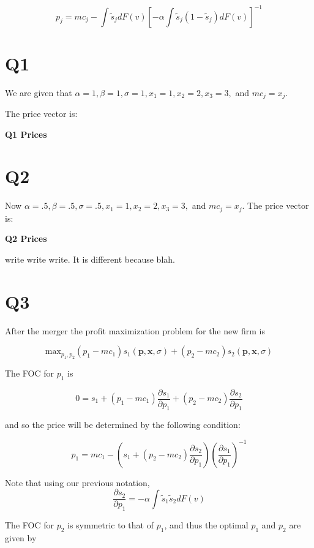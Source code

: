 \documentclass{article}
\newcommand{\1}{\mathbbm{1}}
\begin{document}
$$p_j = mc_j - \int \tilde{s}_j dF(v)[ -\alpha \int \tilde{s}_j(1-\tilde{s}_j)dF(v)]^{-1}$$

\section{Q1}
We are given that $\alpha = 1, \beta = 1, \sigma = 1, x_1 = 1, x_2 = 2, x_3 = 3,$ and $mc_j = x_j$. 

The price vector is: 

\begin{center}
	\centering
	\textbf{Q1 Prices }\par\medskip
	\scalebox{1}{
		
	}
\end{center}

\section{Q2}
Now $\alpha = .5, \beta = .5, \sigma = .5, x_1 = 1, x_2 = 2, x_3 = 3,$ and $mc_j = x_j$. 
The price vector is: 

\begin{center}
	\centering
	\textbf{Q2 Prices}\par\medskip
	\scalebox{1}{
		
	}
\end{center}

\color{red}
write write write. It is different because blah.
\color{black}


\section{Q3}
After the merger the profit maximization problem for the new firm is  

$$\text{max}_{p_1, p_2} (p_1 - mc_1)s_1(\bm p, \bm x, \sigma) + (p_2 - mc_2)s_2(\bm p, \bm x, \sigma)$$

The FOC for $p_1$ is 

$$0 = s_1 + (p_1 - mc_1)\frac{\partial s_1}{\partial p_1}   + (p_2 - mc_2)\frac{\partial s_2}{\partial p_1}$$

and so the price will be determined by the following condition:

$$p_1 = mc_1 - (s_1 + (p_2 - mc_2)\frac{\partial s_2}{\partial p_1})(\frac{\partial s_1}{\partial p_1})^{-1}$$

Note that using our previous notation,
$$\frac{\partial s_2}{\partial p_1} = - \alpha \int \tilde{s}_1\tilde{s}_2dF(v)$$

The FOC for $p_2$ is symmetric to that of $p_1$, and thus the optimal $p_1$ and $p_2$ are given by
\end{document}
